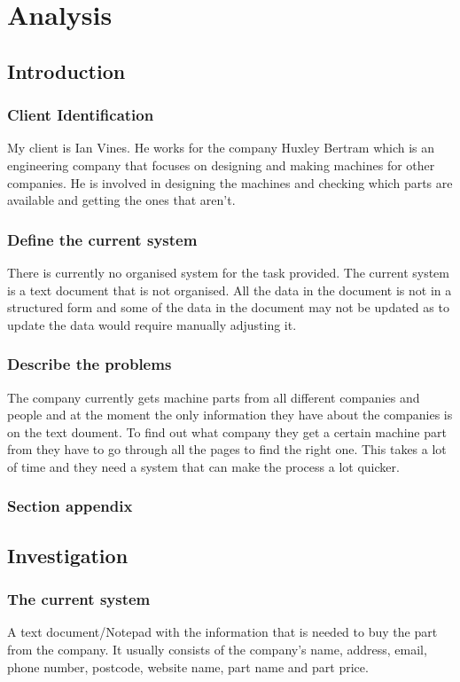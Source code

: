 \chapter{Analysis}

\section{Introduction}

\subsection{Client Identification}
My client is Ian Vines. He works for the company Huxley Bertram which is an engineering company that focuses on designing and making machines for other companies. He is involved in designing the machines and checking which parts are available and getting the ones that aren't.
\subsection{Define the current system}
There is currently no organised system for the task provided. The current system is a text document that is not organised. All the data in the document is not in a structured form and some of the data in the document may not be updated as to update the data would require manually adjusting it.
\subsection{Describe the problems}
The company currently gets machine parts from all different companies and people and at the moment the only information they have about the companies is on the text doument. To find out what company they get a certain machine part from they have to go through all the pages to find the right one. This takes a lot of time and they need a system that can make the process a lot quicker.
\subsection{Section appendix}

\section{Investigation}

\subsection{The current system}
A text document/Notepad with the information that is needed to buy the part from the company. It usually consists of the company's name, address, email, phone number, postcode, website name, part name and part price.

